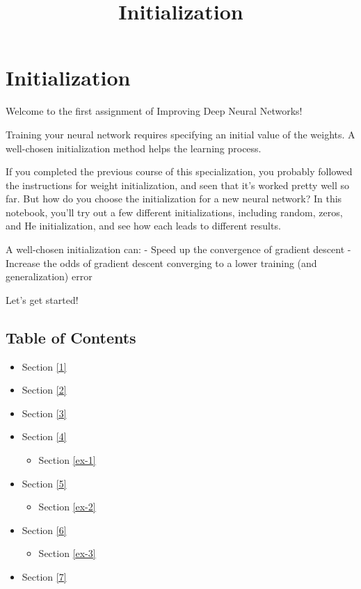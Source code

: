 \documentclass[11pt]{article}
\title{Initialization}
\providecommand{\tightlist}{%
      \setlength{\itemsep}{0pt}\setlength{\parskip}{0pt}}
\begin{document}
    
    \maketitle
    
    

    
    \hypertarget{initialization}{%
\section{Initialization}\label{initialization}}

Welcome to the first assignment of Improving Deep Neural Networks!

Training your neural network requires specifying an initial value of the
weights. A well-chosen initialization method helps the learning process.

If you completed the previous course of this specialization, you
probably followed the instructions for weight initialization, and seen
that it's worked pretty well so far. But how do you choose the
initialization for a new neural network? In this notebook, you'll try
out a few different initializations, including random, zeros, and He
initialization, and see how each leads to different results.

A well-chosen initialization can: - Speed up the convergence of gradient
descent - Increase the odds of gradient descent converging to a lower
training (and generalization) error

Let's get started!

    \hypertarget{table-of-contents}{%
\subsection{Table of Contents}\label{table-of-contents}}

\begin{itemize}
\tightlist
\item
  Section \ref{1}
\item
  Section \ref{2}
\item
  Section \ref{3}
\item
  Section \ref{4}

  \begin{itemize}
  \tightlist
  \item
    Section \ref{ex-1}
  \end{itemize}
\item
  Section \ref{5}

  \begin{itemize}
  \tightlist
  \item
    Section \ref{ex-2}
  \end{itemize}
\item
  Section \ref{6}

  \begin{itemize}
  \tightlist
  \item
    Section \ref{ex-3}
  \end{itemize}
\item
  Section \ref{7}
\end{itemize}
\end{document}
